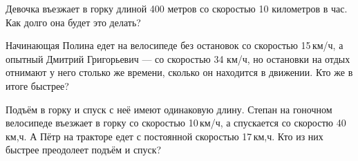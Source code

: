 ﻿
\begin{itemize}

\itA Девочка въезжает в горку длиной 400 метров со скоростью 10 километров в час. Как долго она будет это делать?

\itB Начинающая Полина едет на велосипеде без остановок со скоростью 15\,км/ч, а опытный Дмитрий Григорьевич — со скоростью 34 км/ч, но остановки на отдых отнимают у него столько же времени, сколько он находится в движении. Кто же в итоге быстрее?

\itC Подъём в горку и спуск с неё имеют одинаковую длину. Степан на гоночном велосипеде въезжает в горку со скоростью 10\,км/ч, а спускается со скоростю 40\,км,ч. А Пётр на тракторе едет с постоянной скоростью 17\,км,ч. Кто из них быстрее преодолеет подъём и спуск?
\end{itemize}